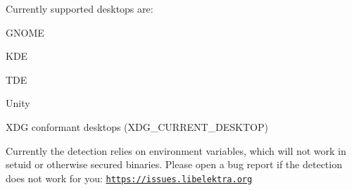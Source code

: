 Currently supported desktops are\+:


\begin{DoxyItemize}
\item G\+N\+O\+ME
\item K\+DE
\item T\+DE
\item Unity
\item X\+DG conformant desktops ({\ttfamily X\+D\+G\+\_\+\+C\+U\+R\+R\+E\+N\+T\+\_\+\+D\+E\+S\+K\+T\+OP})
\end{DoxyItemize}

Currently the detection relies on environment variables, which will not work in setuid or otherwise secured binaries. Please open a bug report if the detection does not work for you\+: \href{https://issues.libelektra.org}{\tt https\+://issues.\+libelektra.\+org} 
